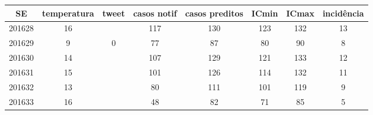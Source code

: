 \begin{tabular}{c|ccccccc}
  \hline
SE & temperatura & tweet & casos notif & casos preditos & ICmin & ICmax & incidência \\ 
  \hline
201628 & 16 &  & 117 & 130 & 123 & 132 & 13 \\ 
  201629 & 9 & 0 & 77 & 87 & 80 & 90 & 8 \\ 
  201630 & 14 &  & 107 & 129 & 121 & 133 & 12 \\ 
  201631 & 15 &  & 101 & 126 & 114 & 132 & 11 \\ 
  201632 & 13 &  & 80 & 111 & 101 & 119 & 9 \\ 
  201633 & 16 &  & 48 & 82 & 71 & 85 & 5 \\ 
   \hline
\end{tabular}
